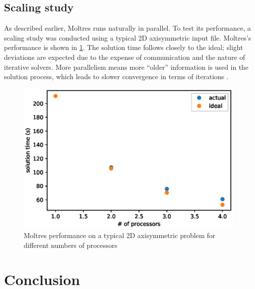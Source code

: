 \documentclass{article}
\let\Oldsection\section
\renewcommand{\section}{\FloatBarrier\Oldsection}
\let\Oldsubsection\subsection
\renewcommand{\subsection}{\FloatBarrier\Oldsubsection}
\begin{document}
\subsection{Scaling study}

As described earlier, Moltres runs naturally in parallel. To test its
performance, a scaling study was conducted using a typical 2D axisymmetric input
file. Moltres's performance is shown in \cref{fig:scaling_study}. The solution
time follows closely to the ideal; slight deviations are expected due to
the expense of communication and the nature of iterative solvers. More
parallelism means more ``older'' information is used in the solution process,
which leads to slower convergence in terms of iterations \cite{satish_balay_petsc_2015}.

\begin{figure}[htpb]
  \centering
  \includegraphics{scaling_study.eps}
  \caption{Moltres performance on a typical 2D axisymmetric problem for
    different numbers of processors}
  \label{fig:scaling_study}
\end{figure}


\section{Conclusion}
\end{document}
